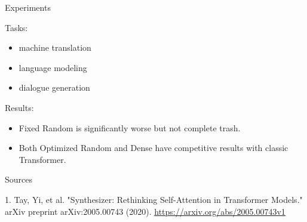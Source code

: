 \documentclass{beamer}
\begin{document}
\begin{frame}{Experiments}

Tasks:
\begin{itemize}
\item machine translation
\item language modeling
\item dialogue generation
\end{itemize}

\vfill

Results:
\begin{itemize}
\item Fixed Random is significantly worse but not complete trash.
\item Both Optimized Random and Dense have competitive results with classic Transformer.
\end{itemize}

\end{frame}

\begin{frame}{Sources}
\begin{thebibliography}{0}

   1. Tay, Yi, et al. "Synthesizer: Rethinking Self-Attention in Transformer Models." arXiv preprint arXiv:2005.00743 (2020). \url{https://arxiv.org/abs/2005.00743v1} 
  
\end{thebibliography}

\end{frame}

 
\end{document}
